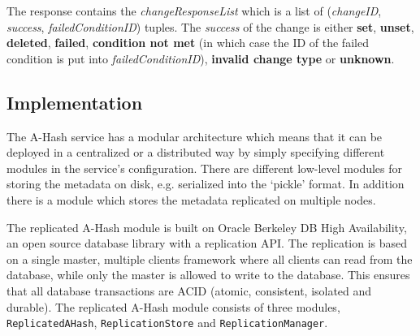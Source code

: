 \documentclass{book}
\begin{document}
\begin{description}
    The response contains the \emph{changeResponseList} which is a list of (\emph{changeID}, \emph{success}, \emph{failedConditionID}) tuples. The \emph{success} of the change is either \textbf{set}, \textbf{unset}, \textbf{deleted}, \textbf{failed}, \textbf{condition not met} (in which case the ID of the failed condition is put into \emph{failedConditionID}), \textbf{invalid change type} or \textbf{unknown}.
    
    
\end{description}
    

\subsection{Implementation} %

The A-Hash service has a modular architecture which means that it can be deployed in a centralized or a distributed way by simply specifying different modules in the service's configuration. There are different low-level modules for storing the metadata on disk, e.g. serialized into the `pickle' format. In addition there is a module which stores the metadata replicated on multiple nodes.

The replicated A-Hash module is built on Oracle Berkeley DB High Availability, an open source database library with a replication API. The replication is based on a single master, multiple clients framework where all clients can read from the database, while only the master is allowed to write to the database. This ensures that all database transactions are ACID (atomic, consistent, isolated and durable). The replicated A-Hash module consists of three modules, \verb!ReplicatedAHash!, \verb!ReplicationStore! and \verb!ReplicationManager!.
\end{document}

